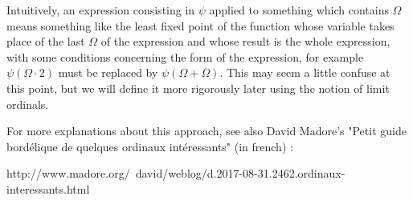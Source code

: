\documentclass[10pt]{article}
\begin{document}
Intuitively, an expression consisting in \( \psi \) applied to something which contains \( \Omega \) means something like the least fixed point of the function whose variable takes place of the last \( \Omega \) of the expression and whose result is the whole expression, with some conditions concerning the form of the expression, for example \( \psi(\Omega \cdot 2) \) must be replaced by \( \psi(\Omega+\Omega) \). This may seem a little confuse at this point, but we will define it more rigorously later using the notion of limit ordinals. 

For more explanations about this approach, see also David Madore's "Petit guide bordélique de quelques ordinaux intéressants" (in french) :

http://www.madore.org/~david/weblog/d.2017-08-31.2462.ordinaux-interessants.html
\end{document}
